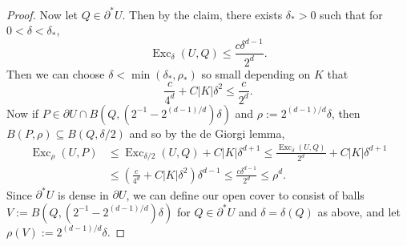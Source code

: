 \documentclass[reqno,10pt]{amsart}
\DeclareMathOperator{\Exc}{Exc}
\theoremstyle{definition}
\numberwithin{equation}{section}
\begin{document}
\begin{proof}
Now let $Q \in \partial^* U$.
Then by the claim, there exists $\delta_* > 0$ such that for $0 < \delta < \delta_*$,
$$\Exc_\delta(U, Q) \leq \frac{c\delta^{d - 1}}{2^d}.$$
Then we can choose $\delta < \min(\delta_*, \rho_*)$ so small depending on $K$ that
$$\frac{c}{4^d} + C|K|\delta^2 \leq \frac{c}{2^d}.$$
Now if $P \in \partial U \cap B(Q, (2^{-1} - 2^{(d - 1)/d})\delta)$ and $\rho := 2^{(d - 1)/d}\delta$, then $B(P, \rho) \subseteq B(Q, \delta/2)$ and so by the de Giorgi lemma,
\begin{align*}
\Exc_\rho(U, P) &\leq \Exc_{\delta/2}(U, Q) + C|K|\delta^{d + 1} \leq \frac{\Exc_\delta(U, Q)}{2^d} + C|K|\delta^{d + 1} \\
&\leq \left(\frac{c}{4^d} + C|K|\delta^2\right)\delta^{d - 1} \leq \frac{c\delta^{d - 1}}{2^d} \leq \rho^d.
\end{align*}
Since $\partial^* U$ is dense in $\partial U$, we can define our open cover to consist of balls $V := B(Q, (2^{-1} - 2^{(d - 1)/d})\delta)$ for $Q \in \partial^* U$ and $\delta = \delta(Q)$ as above, and let $\rho(V) := 2^{(d - 1)/d}\delta$.
\end{proof}
\end{document}
